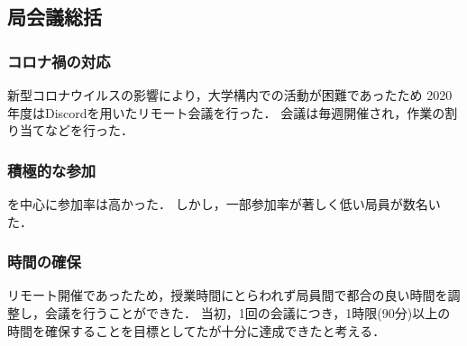 \subsection*{局会議総括}

\subsubsection*{コロナ禍の対応}

新型コロナウイルスの影響により，大学構内での活動が困難であったため
2020年度はDiscordを用いたリモート会議を行った．
会議は毎週開催され，作業の割り当てなどを行った．

\subsubsection*{積極的な参加}

\secondGrade{}を中心に参加率は高かった．
しかし，一部参加率が著しく低い局員が数名いた．

\subsubsection*{時間の確保}

リモート開催であったため，授業時間にとらわれず局員間で都合の良い時間を調整し，会議を行うことができた．
当初，1回の会議につき，1時限(90分)以上の時間を確保することを目標としてたが十分に達成できたと考える．
